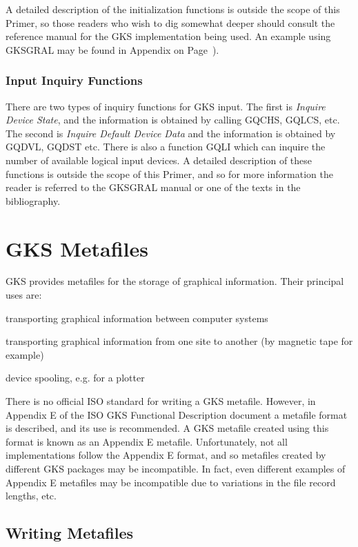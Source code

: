 A detailed description of the initialization functions is outside the scope
of this Primer, so those readers who wish to dig somewhat deeper should
consult the reference manual for the GKS implementation being used.
An example using GKSGRAL may be found in
Appendix on Page~\pageref{sec:iinput}).
\subsection{Input Inquiry Functions}
 
There are two types of inquiry functions for GKS input. The first
is {\it Inquire Device State}, and the information is obtained by
calling GQCHS, GQLCS, etc.
The second is {\it Inquire Default Device Data} and the
information is obtained by GQDVL, GQDST etc. There is also a function
GQLI which can inquire the number of available logical input devices.
A detailed description of these functions is outside the scope of this
Primer, and so for more information the reader is referred to the
GKSGRAL manual or one of the texts in the bibliography.
\chapter{GKS Metafiles}
 
GKS provides metafiles for the storage of graphical information.
Their principal uses are:
\begin{OL}
\item transporting graphical information between computer systems
\item transporting graphical information from one site to another
(by magnetic tape for example)
\item device spooling, e.g. for a plotter
\end{OL}
 
There is no official ISO standard for writing a GKS metafile.
However, in Appendix E of the ISO GKS Functional Description
document a metafile format is described, and its use is recommended.
A GKS metafile created using this format is
known as an Appendix E metafile.
Unfortunately, not all implementations follow the Appendix E format,
and so metafiles created by different GKS packages may be incompatible.
In fact, even different examples of Appendix E metafiles may be
incompatible due to variations in the file record lengths, etc.
\section{Writing Metafiles}
 
